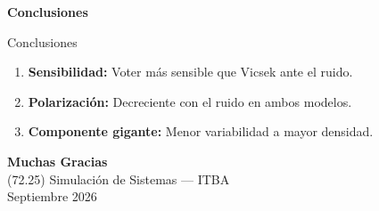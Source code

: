 \documentclass[aspectratio=169]{beamer}
\newcommand{\seccion}[1]{%
  \begin{frame}
    \vfill
    \begin{center}{\Huge\bfseries #1}\end{center}
    \vfill
  \end{frame}
}
\begin{document}
\seccion{Conclusiones}

\begin{frame}{Conclusiones}
  \begin{enumerate}
    \item \textbf{Sensibilidad:} Voter más sensible que Vicsek ante el ruido.
    \item \textbf{Polarización:} Decreciente con el ruido en ambos modelos.
    \item \textbf{Componente gigante:} Menor variabilidad a mayor densidad.
  \end{enumerate}
\end{frame}

\begin{frame}
  \begin{center}
    \vfill
    {\Huge\bfseries Muchas Gracias}\\[1em]
    {\large (72.25) Simulación de Sistemas --- ITBA}\\[0.5em]
    {\large Septiembre 2026}
    \vfill
  \end{center}
\end{frame}

\end{document}

